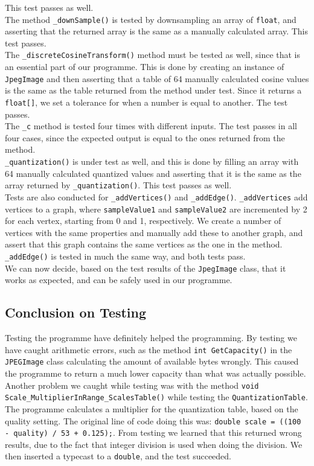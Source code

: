 This test passes as well.\\
The method \lstinline|_downSample()| is tested by downsampling an array of \lstinline|float|, and asserting that the returned array is the same as a manually calculated array.
This test passes.\\
The \lstinline|_discreteCosineTransform()| method must be tested as well, since that is an essential part of our programme.
This is done by creating an instance of \lstinline|JpegImage| and then asserting that a table of 64 manually calculated cosine values is the same as the table returned from the method under test.
Since it returns a \lstinline|float[]|, we set a tolerance for when a number is equal to another.
The test passes.\\
The \lstinline|_c| method is tested four times with different inputs.
The test passes in all four cases, since the expected output is equal to the ones returned from the method.\\
\lstinline|_quantization()| is under test as well, and this is done by filling an array with 64 manually calculated quantized values and asserting that it is the same as the array returned by \lstinline|_quantization()|.
This test passes as well.\\
Tests are also conducted for \lstinline|_addVertices()| and \lstinline|_addEdge()|.
\lstinline|_addVertices| add vertices to a graph, where \lstinline|sampleValue1| and \lstinline|sampleValue2| are incremented by 2 for each vertex, starting from 0 and 1, respectively.
We create a number of vertices with the same properties and manually add these to another graph, and assert that this graph contains the same vertices as the one in the method.
\lstinline|_addEdge()| is tested in much the same way, and both tests pass.\\
We can now decide, based on the test results of the \lstinline|JpegImage| class, that it works as expected, and can be safely used in our programme.

\subsection{Conclusion on Testing}
Testing the programme have definitely helped the programming. By testing we have caught arithmetic errors, such as the method \lstinline|int GetCapacity()| in the \lstinline|JPEGImage| class calculating the amount of available bytes wrongly. This caused the programme to return a much lower capacity than what was actually possible. Another problem we caught while testing was with the method \lstinline|void Scale_MultiplierInRange_ScalesTable()| while testing the \lstinline|QuantizationTable|. The programme calculates a multiplier for the quantization table, based on the quality setting. The original line of code doing this was: \lstinline|double scale = ((100 - quality) / 53 + 0.125);|. From testing we learned that this returned wrong results, due to the fact that integer division is used when doing the division. We then inserted a typecast to a \lstinline|double|, and the test succeeded.


